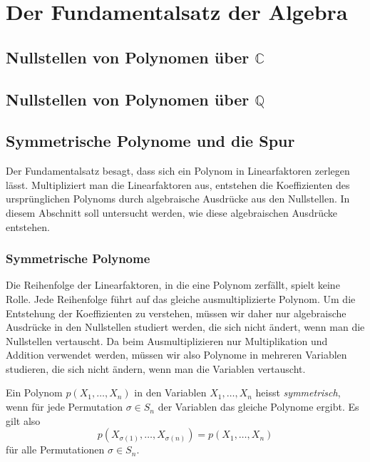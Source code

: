 %
%
%
\section{Der Fundamentalsatz der Algebra
\label{buch:komplex:section:fundamental}}

\subsection{Nullstellen von Polynomen über $\mathbb{C}$}

\subsection{Nullstellen von Polynomen über $\mathbb{Q}$}

%
%
\subsection{Symmetrische Polynome und die Spur}
Der Fundamentalsatz besagt, dass sich ein Polynom in Linearfaktoren
zerlegen lässt.
Multipliziert man die Linearfaktoren aus, entstehen die Koeffizienten
des ursprünglichen Polynoms durch algebraische Ausdrücke aus den
Nullstellen.
In diesem Abschnitt soll untersucht werden, wie diese algebraischen
Ausdrücke entstehen.

%
%
\subsubsection{Symmetrische Polynome}
Die Reihenfolge der Linearfaktoren, in die eine Polynom zerfällt, spielt
keine Rolle.
Jede Reihenfolge führt auf das gleiche ausmultiplizierte Polynom.
Um die Entstehung der Koeffizienten zu verstehen, müssen wir daher nur
algebraische Ausdrücke in den Nullstellen studiert werden, die sich nicht
ändert, wenn man die Nullstellen vertauscht.
Da beim Ausmultiplizieren nur Multiplikation und Addition verwendet
werden, müssen wir also Polynome in mehreren Variablen studieren, die
sich nicht ändern, wenn man die Variablen vertauscht.

\begin{definition}
%
Ein Polynom $p(X_1,\dots,X_n)$ in den Variablen $X_1,\dots,X_n$
heisst \emph{symmetrisch}, wenn für jede Permutation $\sigma\in S_n$
der Variablen das gleiche Polynome ergibt.
Es gilt also
\[
p(X_{\sigma(1)},\dots,X_{\sigma(n)})
=
p(X_1,\dots,X_n)
\]
für alle Permutationen $\sigma\in S_n$.
\end{definition}

